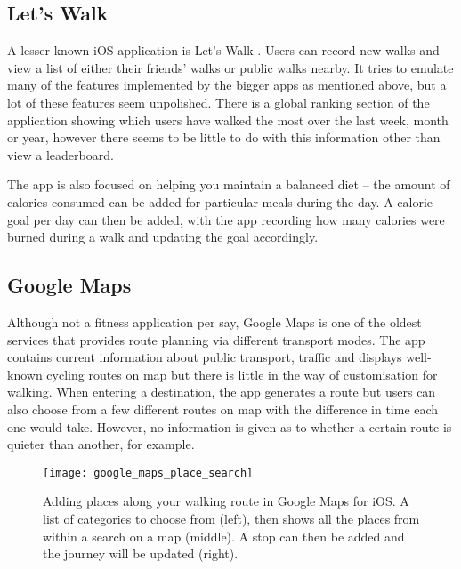 \subsection{Let's Walk}

A lesser-known iOS application is Let's Walk \cite{LetsWalkApp}. Users can record new walks and view a list of either their friends' walks or public walks nearby. It tries to emulate many of the features implemented by the bigger apps as mentioned above, but a lot of these features seem unpolished. There is a global ranking section of the application showing which users have walked the most over the last week, month or year, however there seems to be little to do with this information other than view a leaderboard.

The app is also focused on helping you maintain a balanced diet -- the amount of calories consumed can be added for particular meals during the day. A calorie goal per day can then be added, with the app recording how many calories were burned during a walk and updating the goal accordingly.

\subsection{Google Maps}

Although not a fitness application per say, Google Maps \cite{GoogleInc.} is one of the oldest services that provides route planning via different transport modes. The app contains current information about public transport, traffic and displays well-known cycling routes on map but there is little in the way of customisation for walking. When entering a destination, the app generates a route but users can also choose from a few different routes on map with the difference in time each one would take. However, no information is given as to whether a certain route is quieter than another, for example.

\begin{figure}[hbt]
  \centering
  \texttt{[image: google\_maps\_place\_search]}
  \caption{Adding places along your walking route in Google Maps for iOS. A list of categories to choose from (left), then shows all the places from within a search on a map (middle). A stop can then be added and the journey will be updated (right).}
  \label{fig:google_maps_place_search}
\end{figure}


